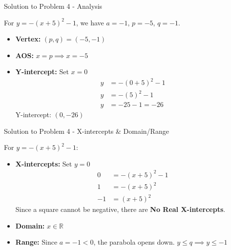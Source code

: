 \documentclass[aspectratio=169]{beamer}
\begin{document}
\begin{frame}{Solution to Problem 4 - Analysis}
    \begin{tcolorbox}[colback=lightgray,colframe=accent,title=Solution 4]
        \footnotesize
        For $y = - (x+5)^2 - 1$, we have $a=-1$, $p=-5$, $q=-1$.
        \begin{itemize}
            \item \textbf{Vertex:} $(p,q) = (-5,-1)$
            \item \textbf{AOS:} $x = p \implies x = -5$
            \item \textbf{Y-intercept:} Set $x=0$
                \begin{align*}
                    y &= -(0+5)^2 - 1 \\
                    y &= -(5)^2 - 1 \\
                    y &= -25 - 1 = -26
                \end{align*}
                Y-intercept: $(0,-26)$
        \end{itemize}
    \end{tcolorbox}
\end{frame}

\begin{frame}{Solution to Problem 4 - X-intercepts & Domain/Range}
    \begin{tcolorbox}[colback=lightgray,colframe=accent,title=Solution 4 (Cont.)]
        \footnotesize
        For $y = - (x+5)^2 - 1$:
        \begin{itemize}
            \item \textbf{X-intercepts:} Set $y=0$
                \begin{align*}
                    0 &= -(x+5)^2 - 1 \\
                    1 &= -(x+5)^2 \\
                    -1 &= (x+5)^2
                \end{align*}
                Since a square cannot be negative, there are \textbf{No Real X-intercepts}.
            \item \textbf{Domain:} $x \in \mathbb{R}$
            \item \textbf{Range:} Since $a=-1<0$, the parabola opens down. $y \leq q \implies y \leq -1$
        \end{itemize}
    \end{tcolorbox}
\end{frame}
\end{document}
